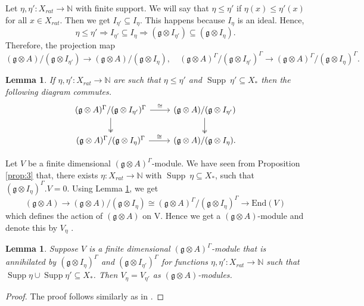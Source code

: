 \documentclass[11pt]{amsart}
\theoremstyle{plain}
\newtheorem{lemma}[thm]{Lemma}
\theoremstyle{definition}
\newcommand{\g}{\mathfrak{g}}
\DeclareMathOperator{\Supp}{Supp}
\begin{document}
Let $\eta,\eta':X_{rat}\rightarrow\mathbb{N}$ with finite support. We will say that $\eta\leq\eta'$ if $\eta(x)\leq\eta'(x)$ for all $x\in X_{rat}$. Then we get $I_{\eta'}\subseteq I_{\eta}$. This happens because $I_{\eta}$ is an ideal. Hence,
\begin{equation*}
    \eta\leq\eta'\Rightarrow I_{\eta'}\subseteq I_{\eta}\Rightarrow (\g\otimes I_{\eta'})\subseteq(\g\otimes I_{\eta}).
\end{equation*}
Therefore, the projection map
\begin{equation*}
     (\g\otimes A)/(\g\otimes I_{\eta'})\rightarrow(\g\otimes A)/(\g\otimes I_{\eta}), \quad (\g\otimes A)^{\Gamma}/(\g\otimes I_{\eta'})^{\Gamma}\rightarrow(\g\otimes A)^{\Gamma}/(\g\otimes I_{\eta})^{\Gamma}.
\end{equation*}
\begin{lemma}\label{lem:18}
    If $\eta,\eta':X_{rat}\rightarrow\mathbb{N}$ are such that $\eta\leq\eta'$ and $\Supp\ \eta'\subseteq X_{*}$ then the following diagram commutes.\\
    \[
\begin{tikzcd}
(\g \otimes A)^\Gamma / (\g \otimes I_{\eta'})^\Gamma \arrow[r, "\cong"] \arrow[d, two heads] & (\g \otimes A) / (\g \otimes I_{\eta'}) \arrow[d, two heads] \\
(\g \otimes A)^\Gamma / (\g \otimes I_{\eta})^\Gamma \arrow[r, "\cong"] & (\g \otimes A) / (\g \otimes I_{\eta}).
\end{tikzcd}
\]
\end{lemma}
\smallskip

Let $V$ be a finite dimensional $(\g\otimes A)^{\Gamma}$-module. We have seen from Proposition \ref{prop:3} that, there exists $\eta:X_{rat}\rightarrow\mathbb{N}$ with $\Supp~\eta\subseteq X_{*}$, such that $(\g\otimes I_{\eta})^{\Gamma}.V=0$. Using Lemma \ref{lem:18}, we get
\begin{equation}\label{eq:5}
    (\g\otimes A)\rightarrow(\g\otimes A)/(\g\otimes I_{\eta})\cong(\g\otimes A)^{\Gamma}/(\g\otimes I_{\eta})^{\Gamma}\rightarrow\mbox{End}(V)
\end{equation}
which defines the action of $(\g\otimes A)$ on V. Hence we get a $(\g\otimes A)$-module and denote this by $V_{\eta}$ \label{pg:9}.
\begin{lemma}
    Suppose $V$ is a finite dimensional $(\g\otimes A)^{\Gamma}$-module that is annihilated by $(\g\otimes I_{\eta})^{\Gamma}$ and $(\g\otimes I_{\eta'})^{\Gamma}$ for functions $\eta,\eta':X_{rat}\rightarrow\mathbb{N}$ such that $\Supp\eta\cup \Supp\eta'\subseteq X_{*}$. Then $V_{\eta}=V_{\eta'}$ as $(\g\otimes A)$-modules.
\end{lemma}
\begin{proof}
 The proof follows similarly as in \cite[Lemma 2.6]{FKKS12}.
\end{proof}
\smallskip
\end{document}
